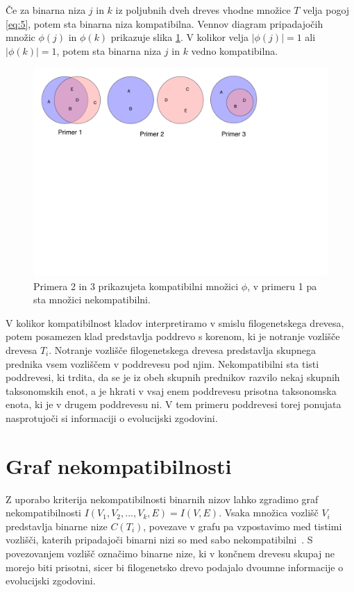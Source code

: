 \documentclass[a4paper, 12pt]{book}
\begin{document}
Če za binarna niza $j$ in $k$ iz poljubnih dveh dreves vhodne množice $T$ velja pogoj \ref{eq:5}, potem sta binarna niza kompatibilna. Vennov diagram pripadajočih množic $\phi(j)$ in $\phi(k)$ prikazuje slika \ref{img-venn-compatibility}. V kolikor velja $\left|\phi(j)\right| = 1$ ali $\left|\phi(k)\right| = 1$, potem sta binarna niza $j$ in $k$ vedno kompatibilna.   

\begin{figure}
	\begin{center}
		\includegraphics[scale=0.54, clip=true, trim=0 15cm 0 0]{gfx/venn-amt-compatibility.pdf}
	\end{center}
	\caption{Primera 2 in 3 prikazujeta kompatibilni množici $\phi$, v primeru 1 pa sta množici nekompatibilni.}
	\label{img-venn-compatibility}
\end{figure}

V kolikor kompatibilnost kladov interpretiramo v smislu filogenetskega drevesa, potem posamezen klad predstavlja poddrevo s korenom, ki je notranje vozlišče drevesa $T_i$. Notranje vozlišče filogenetskega drevesa predstavlja skupnega prednika vsem vozliščem v poddrevesu pod njim. Nekompatibilni sta tisti poddrevesi, ki trdita, da se je iz obeh skupnih prednikov razvilo nekaj skupnih taksonomskih enot, a je hkrati v vsaj enem poddrevesu prisotna taksonomska enota, ki je v drugem poddrevesu ni. V tem primeru poddrevesi torej ponujata nasprotujoči si informaciji o evolucijski zgodovini. 

\section{Graf nekompatibilnosti}
Z uporabo kriterija nekompatibilnosti binarnih nizov lahko zgradimo graf nekompatibilnosti $I(V_1, V_2, ..., V_k, E) = I(V, E)$. Vsaka množica vozlišč $V_i$ predstavlja binarne nize $C(T_i)$, povezave v grafu pa vzpostavimo med tistimi vozlišči, katerih pripadajoči binarni nizi so med sabo nekompatibilni~\cite{pw}. S povezovanjem vozlišč označimo binarne nize, ki v končnem drevesu skupaj ne morejo biti prisotni, sicer bi filogenetsko drevo podajalo dvoumne informacije o evolucijski zgodovini. 
\end{document}
